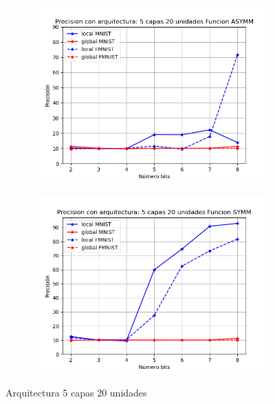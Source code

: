 \begin{figure}[H]
    \centering
    \begin{subfigure}[H]{0.475\textwidth}
    \includegraphics[width=\textwidth]{imagenes/backprop/Precision con arquitectura: 5 capas 20 unidades Funcion ASYMM.png}
    \end{subfigure}
    \begin{subfigure}[H]{0.475\textwidth}
    \includegraphics[width=\textwidth]{imagenes/backprop/Precision con arquitectura: 5 capas 20 unidades Funcion SYMM.png}
    \end{subfigure}
    \caption{Arquitectura 5 capas 20 unidades}
\end{figure}

